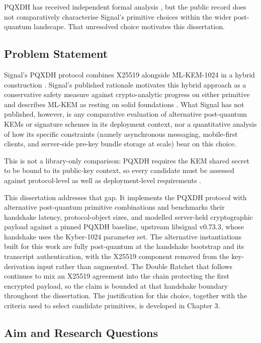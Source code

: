 PQXDH has received independent formal analysis \cite{bhargavan_formal_2024}, but the public record does not comparatively characterise Signal's primitive choices within the wider post-quantum landscape. That unresolved choice motivates this dissertation.

\subsection{Problem Statement}
\label{subsec:problem-statement}

Signal's PQXDH protocol combines X25519 alongside ML-KEM-1024 in a hybrid construction \cite{kret_pqxdh_nodate}. Signal's published rationale motivates this hybrid approach as a conservative safety measure against crypto-analytic progress on either primitive and describes ML-KEM as resting on solid foundations \cite{kret_pqxdh_nodate, kret_quantum_nodate}. What Signal has not published, however, is any comparative evaluation of alternative post-quantum KEMs or signature schemes in its deployment context, nor a quantitative analysis of how its specific constraints (namely asynchronous messaging, mobile-first clients, and server-side pre-key bundle storage at scale) bear on this choice.

This is not a library-only comparison: PQXDH requires the KEM shared secret to be bound to its public-key context, so every candidate must be assessed against protocol-level as well as deployment-level requirements \cite{bhargavan_formal_2024}.

This dissertation addresses that gap. It implements the PQXDH protocol with alternative post-quantum primitive combinations and benchmarks their handshake latency, protocol-object sizes, and modelled server-held cryptographic payload against a pinned PQXDH baseline, upstream libsignal v0.73.3, whose handshake uses the Kyber-1024 parameter set. The alternative instantiations built for this work are fully post-quantum at the handshake bootstrap and its transcript authentication, with the X25519 component removed from the key-derivation input rather than augmented. The Double Ratchet that follows continues to mix an X25519 agreement into the chain protecting the first encrypted payload, so the claim is bounded at that handshake boundary throughout the dissertation. The justification for this choice, together with the criteria used to select candidate primitives, is developed in Chapter 3.

\subsection{Aim and Research Questions}
\label{subsec:aims-objectives}

